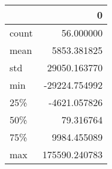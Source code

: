 \begin{tabular}{lr}
\toprule
{} &              0 \\
\midrule
count &      56.000000 \\
mean  &    5853.381825 \\
std   &   29050.163770 \\
min   &  -29224.754992 \\
25\%   &   -4621.057826 \\
50\%   &      79.316764 \\
75\%   &    9984.455089 \\
max   &  175590.240783 \\
\bottomrule
\end{tabular}
